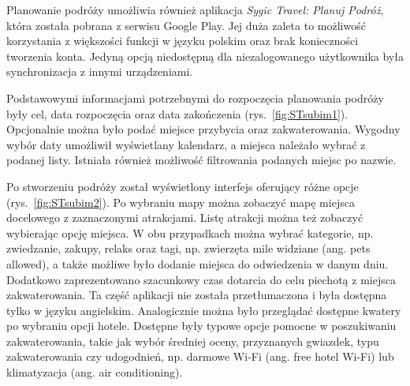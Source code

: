 \documentclass[10pt,twoside,a4paper]{report}
\begin{document}
\par Planowanie podróży umożliwia również aplikacja \textit{Sygic Travel: Planuj Podróż}, która została pobrana z serwisu Google Play. Jej duża zaleta to możliwość korzystania z większości funkcji w języku polskim oraz brak konieczności tworzenia konta. Jedyną opcją niedostępną dla niezalogowanego użytkownika była synchronizacja z innymi urządzeniami.
\par Podstawowymi informacjami potrzebnymi do rozpoczęcia planowania podróży były cel, data rozpoczęcia oraz data zakończenia (rys.~\ref{fig:STsubim1}). Opcjonalnie można było podać miejsce przybycia oraz zakwaterowania. Wygodny wybór daty umożliwił wyświetlany kalendarz, a miejsca należało wybrać z podanej listy. Istniała również możliwość filtrowania podanych miejsc po nazwie.
\par Po stworzeniu podróży został wyświetlony interfejs oferujący różne opcje (rys.~\ref{fig:STsubim2}). Po wybraniu mapy można zobaczyć mapę miejsca docelowego z zaznaczonymi atrakcjami. Listę atrakcji można też zobaczyć wybierając opcję miejsca. W obu przypadkach można wybrać kategorie, np. zwiedzanie, zakupy, relaks oraz tagi, np. zwierzęta mile widziane (ang. pets allowed), a także możliwe było dodanie miejsca do odwiedzenia w danym dniu. Dodatkowo zaprezentowano szacunkowy czas dotarcia do celu piechotą z miejsca zakwaterowania. Ta część aplikacji nie została przetłumaczona i była dostępna tylko w języku angielskim. Analogicznie można było przeglądać dostępne kwatery po wybraniu opcji hotele. Dostępne były typowe opcje pomocne w poszukiwaniu zakwaterowania, takie jak wybór średniej oceny, przyznanych gwiazdek, typu zakwaterowania czy udogodnień, np. darmowe Wi-Fi (ang. free hotel Wi-Fi) lub klimatyzacja (ang. air conditioning).
\end{document}

